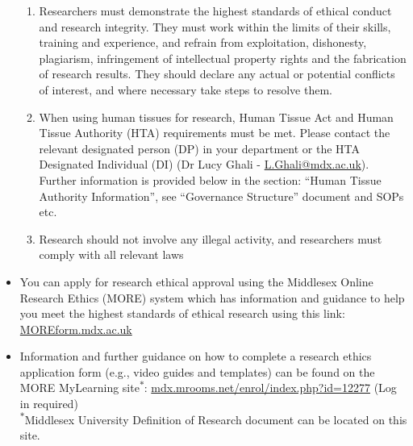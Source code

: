 \documentclass{MDXHandbook}
\begin{document}
\begin{itemize}
\begin{enumerate}
			\item Researchers must demonstrate the highest standards of ethical conduct and research integrity. They must work within the limits of their skills, training and experience, and refrain from exploitation, dishonesty, plagiarism, infringement of intellectual property rights and the fabrication of research results. They should declare any actual or potential conflicts of interest, and where necessary take steps to resolve them. 
			\item When using human tissues for research, Human Tissue Act and Human Tissue Authority (HTA) requirements must be met. Please contact the relevant designated person (DP) in your department or the HTA Designated Individual (DI) (Dr Lucy Ghali - \href{mailto:L.Ghali@mdx.ac.uk}{L.Ghali@mdx.ac.uk}). Further information is provided below in the section: ``Human Tissue Authority Information'', see ``Governance Structure'' document and SOPs etc.
			\item Research should not involve any illegal activity, and researchers must comply with all relevant laws
		\end{enumerate}
	\item You can apply for research ethical approval using the Middlesex Online Research Ethics (MORE) system which has information and guidance to help you meet the highest standards of ethical research using this link: \url{MOREform.mdx.ac.uk}
	\item Information and further guidance on how to complete a research ethics application form (e.g., video guides and templates) can be found on the MORE MyLearning site\textsuperscript{$\ast$}: \url{mdx.mrooms.net/enrol/index.php?id=12277} (Log in required)\\ 
 \textsuperscript{$\ast$}Middlesex University Definition of Research document can be located on this site.
\end{itemize}
\end{document}
